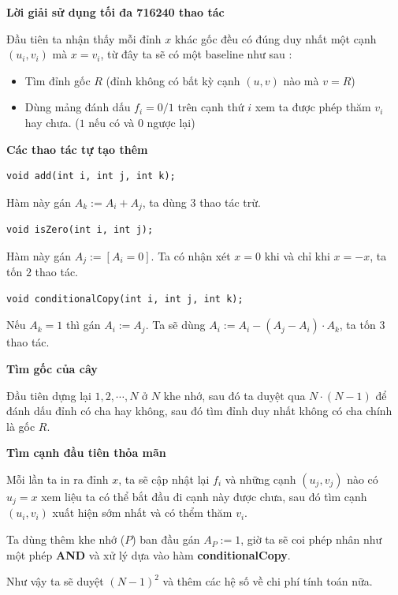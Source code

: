 \LARGE{\textbf{Lời giải sử dụng tối đa 716240 thao tác}}

Đầu tiên ta nhận thấy mỗi đỉnh $x$ khác gốc đều có đúng duy nhất một cạnh $(u_i, v_i)$ mà $x = v_i$, từ đây ta sẽ có một baseline như sau : 
\begin{itemize}
 \item Tìm đỉnh gốc $R$ (đỉnh không có bất kỳ cạnh $(u, v)$ nào mà $v = R$)
 \item Dùng mảng đánh dấu $f_i = 0/1$ trên cạnh thứ $i$ xem ta được phép thăm $v_i$ hay chưa. ($1$ nếu có và $0$ ngược lại)
\end{itemize}

\Large{\textbf{Các thao tác tự tạo thêm}}

\begin{lstlisting}
void add(int i, int j, int k);
\end{lstlisting}

Hàm này gán $A_k := A_i + A_j$, ta dùng $3$ thao tác trừ.

\begin{lstlisting}
void isZero(int i, int j);
\end{lstlisting}

Hàm này gán $A_j := [A_i = 0]$. Ta có nhận xét $x = 0$ khi và chỉ khi $x = -x$, ta tốn $2$ thao tác.

\begin{lstlisting}
void conditionalCopy(int i, int j, int k);
\end{lstlisting}

Nếu $A_k = 1$ thì gán $A_i := A_j$. Ta sẽ dùng $A_i := A_i - (A_j - A_i) \cdot A_k$, ta tốn $3$ thao tác. 

\Large{\textbf{Tìm gốc của cây}}

Đầu tiên dựng lại $1, 2, \cdots, N$ ở $N$ khe nhớ, sau đó ta duyệt qua $N \cdot (N - 1)$ để đánh dấu đỉnh có cha hay không, sau đó tìm đỉnh duy nhất không có cha chính là gốc $R$.

\Large{\textbf{Tìm cạnh đầu tiên thỏa mãn}}

Mỗi lần ta in ra đỉnh $x$, ta sẽ cập nhật lại $f_i$ và những cạnh $(u_j, v_j)$ nào có $u_j = x$ xem liệu ta có thể bắt đầu đi cạnh này được chưa, sau đó tìm cạnh $(u_i, v_i)$ xuất hiện sớm nhất và có thểm thăm $v_i$.

Ta dùng thêm khe nhớ ($P$) ban đầu gán $A_P := 1$, giờ ta sẽ coi phép nhân như một phép \textbf{AND} và xử lý dựa vào hàm \textbf{conditionalCopy}.

Như vậy ta sẽ duyệt $(N - 1)^2$ và thêm các hệ số về chi phí tính toán nữa.